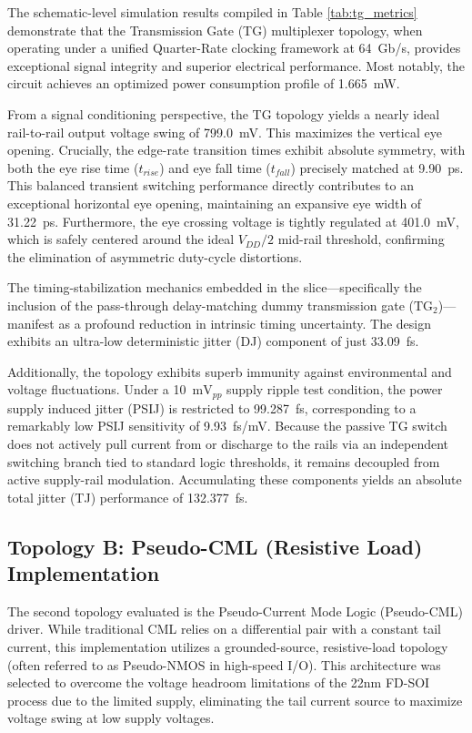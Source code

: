 The schematic-level  simulation results compiled in Table \ref{tab:tg_metrics} demonstrate that the Transmission Gate (TG) multiplexer topology, when operating under a unified Quarter-Rate clocking framework at 64~Gb/s, provides exceptional signal integrity and superior electrical performance. Most notably, the circuit achieves an optimized power consumption profile of 1.665~mW.

From a signal conditioning perspective, the TG topology yields a nearly ideal rail-to-rail output voltage swing of 799.0~mV. This maximizes the vertical eye opening. Crucially, the edge-rate transition times exhibit absolute symmetry, with both the eye rise time ($t_{rise}$) and eye fall time ($t_{fall}$) precisely matched at 9.90~ps. This balanced transient switching performance directly contributes to an exceptional horizontal eye opening, maintaining an expansive eye width of 31.22~ps. Furthermore, the eye crossing voltage is tightly regulated at 401.0~mV, which is safely centered around the ideal $V_{DD}/2$ mid-rail threshold, confirming the elimination of asymmetric duty-cycle distortions.

The timing-stabilization mechanics embedded in the slice—specifically the inclusion of the pass-through delay-matching dummy transmission gate ($\text{TG}_2$)—manifest as a profound reduction in intrinsic timing uncertainty. The design exhibits an ultra-low deterministic jitter (DJ) component of just 33.09~fs. 

Additionally, the topology exhibits superb immunity against environmental and voltage fluctuations. Under a 10~$\text{mV}_{pp}$ supply ripple test condition, the power supply induced jitter (PSIJ) is restricted to 99.287~fs, corresponding to a remarkably low PSIJ sensitivity of 9.93~fs/mV. Because the passive TG switch does not actively pull current from or discharge to the rails via an independent switching branch tied to standard logic thresholds, it remains decoupled from active supply-rail modulation. Accumulating these components yields an absolute total jitter (TJ) performance of 132.377~fs.

\subsection{Topology B: Pseudo-CML (Resistive Load) Implementation}
\label{subsec:cml_impl}

The second topology evaluated is the Pseudo-Current Mode Logic (Pseudo-CML) driver. While traditional CML relies on a differential pair with a constant tail current, this implementation utilizes a grounded-source, resistive-load topology (often referred to as Pseudo-NMOS in high-speed I/O). This architecture was selected to overcome the voltage headroom limitations of the 22nm FD-SOI process due to the limited supply, eliminating the tail current source to maximize voltage swing at low supply voltages.

